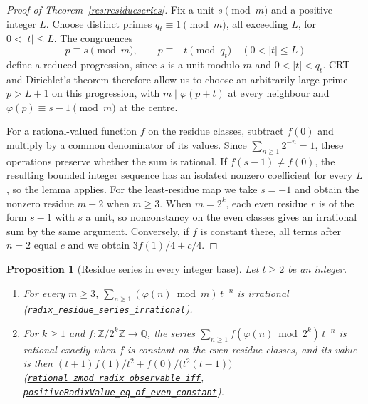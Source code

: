\documentclass[11pt]{article}
\theoremstyle{plain}
\newtheorem{prop}[thm]{Proposition}
\theoremstyle{definition}
\theoremstyle{remark}
\newcommand{\Z}{\mathbb{Z}}
\newcommand{\Q}{\mathbb{Q}}
\begin{document}
\begin{proof}[Proof of Theorem~\ref{res:residueseries}]
Fix a unit $s\pmod m$ and a positive integer $L$.
Choose distinct primes $q_t\equiv1\pmod m$, all exceeding $L$, for
$0<|t|\le L$. The congruences
\[
 p\equiv s\pmod m,\qquad p\equiv-t\pmod{q_t}\quad(0<|t|\le L)
\]
define a reduced progression, since $s$ is a unit modulo $m$ and
$0<|t|<q_t$. CRT and Dirichlet's theorem therefore allow us to choose
an arbitrarily large prime $p>L+1$ on this progression, with
$m\mid\varphi(p+t)$ at every neighbour and
$\varphi(p)\equiv s-1\pmod m$ at the centre.

For a rational-valued function $f$ on the residue classes, subtract
$f(0)$ and multiply by a common denominator of its values. Since
$\sum_{n\ge1}2^{-n}=1$, these operations preserve whether the sum is
rational. If $f(s-1)\ne f(0)$, the resulting bounded integer sequence
has an isolated nonzero coefficient for every $L$, so the lemma
applies.
For the least-residue map we take $s=-1$ and obtain the nonzero
residue $m-2$ when $m\ge3$. When $m=2^k$, each even residue $r$
is of the form $s-1$ with $s$ a unit, so nonconstancy on the even
classes gives an irrational sum by the same argument.
Conversely, if $f$ is constant there, all terms after $n=2$ equal
$c$ and we obtain $3f(1)/4+c/4$.
\end{proof}

\begin{prop}[Residue series in every integer base]
\label{prop:radixresidue}
Let $t\ge2$ be an integer.
\begin{enumerate}[label=(\alph*),leftmargin=*]
\item For every $m\ge3$, $\sum_{n\ge1}(\varphi(n)\bmod m)\,t^{-n}$ is
  irrational
  (\href{https://github.com/wcook04/plectis-erdos/blob/24edbddbe2bd68e920327a701aad0b9dd0d69675/lean/ErdosProblems/Erdos249/PaperCompleteR7/RationalIntegerRadixClassification.lean\#L128}{\texttt{radix\_residue\_series\_irrational}}).
\item For $k\ge1$ and $f:\Z/2^k\Z\to\Q$, the series
  $\sum_{n\ge1}f(\varphi(n)\bmod2^k)\,t^{-n}$ is rational exactly when $f$
  is constant on the even residue classes, and its value is then
  $(t+1)f(1)/t^2+f(0)/\bigl(t^2(t-1)\bigr)$
  (\href{https://github.com/wcook04/plectis-erdos/blob/24edbddbe2bd68e920327a701aad0b9dd0d69675/lean/ErdosProblems/Erdos249/PaperCompleteR7/RationalIntegerRadixClassification.lean\#L145}{\texttt{rational\_zmod\_radix\_observable\_iff}},
  \href{https://github.com/wcook04/plectis-erdos/blob/24edbddbe2bd68e920327a701aad0b9dd0d69675/lean/ErdosProblems/Erdos249/PaperCompleteR7/IntegerRadixObservables.lean\#L303}{\texttt{positiveRadixValue\_eq\_of\_even\_constant}}).
\end{enumerate}
\end{prop}
\end{document}
